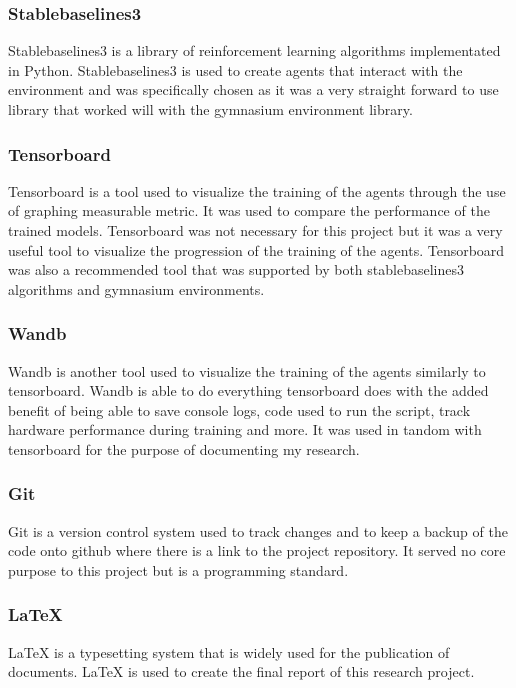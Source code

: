 \subsubsection*{Stablebaselines3}
Stablebaselines3 is a library of reinforcement learning algorithms implementated in Python. Stablebaselines3 is used to create agents that interact with the environment and was specifically chosen as it was a very straight forward to use library that worked will with the gymnasium environment library.

\subsubsection*{Tensorboard}
Tensorboard is a tool used to visualize the training of the agents through the use of graphing measurable metric. It was used to compare the performance of the trained models. Tensorboard was not necessary for this project but it was a very useful tool to visualize the progression of the training of the agents. Tensorboard was also a recommended tool that was supported by both stablebaselines3 algorithms and gymnasium environments.

\subsubsection*{Wandb}
Wandb is another tool used to visualize the training of the agents similarly to tensorboard. Wandb is able to do everything tensorboard does with the added benefit of being able to save console logs, code used to run the script, track hardware performance during training and more. It was used in tandom with tensorboard for the purpose of documenting my research.

\subsubsection*{Git}
Git is a version control system used to track changes and to keep a backup of the code onto github where there is a link to the project repository. It served no core purpose to this project but is a programming standard. 

\subsubsection*{LaTeX}
LaTeX is a typesetting system that is widely used for the publication of documents. LaTeX is used to create the final report of this research project.

